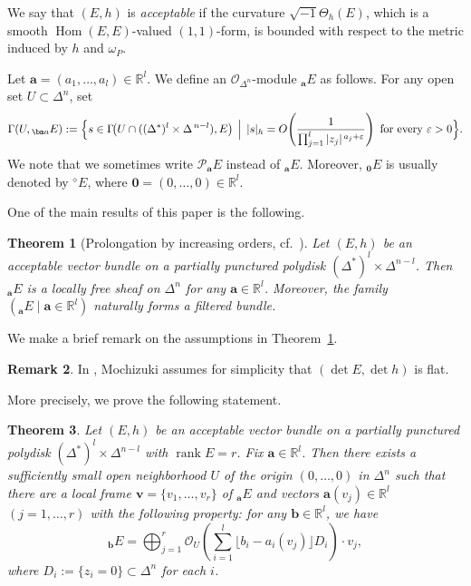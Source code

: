 \documentclass[12pt,twoside]{amsart}
\DeclareMathOperator{\rank}{rank}
\DeclareMathOperator{\Hom}{Hom}
\newtheorem{thm}{Theorem}[section]
\theoremstyle{definition}
\newtheorem{rem}[thm]{Remark}
\begin{document}
We say that $(E,h)$ is \emph{acceptable} if the curvature
$\sqrt{-1}\Theta_{h}(E)$, which is a smooth $\Hom(E,E)$-valued $(1,1)$-form,
is bounded with respect to the metric induced by $h$ and $\omega_{P}$.

Let $\bm a = (a_{1},\dots,a_{l}) \in \mathbb{R}^{l}$.
We define an $\mathcal O_{\Delta^n}$-module ${}_{\bm a}E$ as follows.
For any open set $U \subset \Delta^{n}$, set
\[
  \Gamma(U, {}_{\bm a}E)
  :=
  \Bigl\{
     s \in \Gamma\!\bigl(U \cap ((\Delta^{*})^{l}\times \Delta^{\,n-l}), E\bigr)
     \,\Bigm|\,
     |s|_{h}
       = O\!\left(
           \frac{1}{\prod_{j=1}^{l} |z_{j}|^{\,a_{j}+\varepsilon}}
         \right)
     \text{ for every }\varepsilon>0
  \Bigr\}.
\]
We note that we sometimes write $\mathcal P_{\bm a} E$ instead of
${}_{\bm a} E$. Moreover, ${}_{\bm 0} E$ is usually denoted by 
${}^\diamond\!E$, where $\bm 0=(0, \ldots, 0)\in \mathbb R^l$.  

\medskip

One of the main results of this paper is the following.

\begin{thm}[{Prolongation by increasing orders, 
cf.~\cite[Theorem~21.3.1]{mochizuki4}}]
\label{x-thm1.1}
Let $(E, h)$ be an acceptable vector bundle on a partially punctured
polydisk $(\Delta^*)^l\times \Delta^{n-l}$.
Then ${}_{\bm a} E$ is a locally free sheaf on $\Delta^n$ for any
$\bm a \in \mathbb R^l$.
Moreover, the family $\left( {}_{\bm a} E \mid \bm a\in \mathbb R^l 
\right)$
naturally forms a filtered bundle.
\end{thm}

We make a brief remark on the assumptions in Theorem~\ref{x-thm1.1}.

\begin{rem}\label{x-rem1.2}
In \cite[Theorem~21.3.1]{mochizuki4}, Mochizuki assumes for simplicity
that $(\det E, \det h)$ is flat.
\end{rem}
More precisely, we prove the following statement.

\begin{thm}\label{x-thm1.3}
Let $(E, h)$ be an acceptable vector bundle on a partially punctured
polydisk $(\Delta^*)^l \times \Delta^{n-l}$ with $\rank E = r$.
Fix $\bm a \in \mathbb R^l$.
Then there exists a sufficiently small open neighborhood
$U$ of the origin $(0,\ldots,0)$ in $\Delta^n$ such that
there are a local frame $\bm v = \{v_1,\ldots,v_r\}$ of ${}_{\bm a} E$
and vectors $\bm a(v_j) \in \mathbb R^l$ $(j=1,\ldots,r)$
with the following property:
for any $\bm b \in \mathbb R^l$, we have
\[
{}_{\bm b} E
=
\bigoplus_{j=1}^r
\mathcal O_U\!\left(
  \sum_{i=1}^l \lfloor b_i - a_i(v_j) \rfloor D_i
\right)\!\cdot v_j,
\]
where $D_i := \{z_i = 0\} \subset \Delta^n$ for each $i$.
\end{thm}
\end{document}
